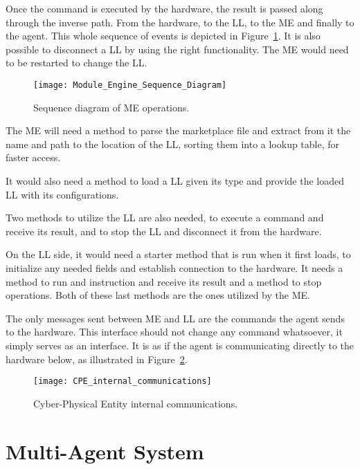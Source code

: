 Once the command is executed by the hardware, the result is passed along through the inverse path. From the hardware, to the \acrlong{LL}, to the \acrlong{ME} and finally to the agent. This whole sequence of events is depicted in Figure~\ref{fig:module_engine_sequence_diagram}. It is also possible to disconnect a \acrshort{LL} by using the right functionality. The \acrshort{ME} would need to be restarted to change the \acrshort{LL}.

\begin{figure}[h!]
	\centering
	\texttt{[image: Module\_Engine\_Sequence\_Diagram]}
	\caption{Sequence diagram of \acrlong{ME} operations.}
	\label{fig:module_engine_sequence_diagram}
\end{figure}

The \acrshort{ME} will need a method to parse the marketplace file and extract from it the name and path to the location of the \acrshort{LL}, sorting them into a lookup table, for faster access.

It would also need a method to load a \acrlong{LL} given its type and provide the loaded \acrshort{LL} with its configurations.

Two methods to utilize the \acrshort{LL} are also needed, to execute a command and receive its result, and to stop the \acrshort{LL} and disconnect it from the hardware.

On the \acrlong{LL} side, it would need a starter method that is run when it first loads, to initialize any needed fields and establish connection to the hardware. It needs a method to run and instruction and receive its result and a method to stop operations. Both of these last methods are the ones utilized by the \acrshort{ME}.

The only messages sent between \acrshort{ME} and \acrshort{LL} are the commands the agent sends to the hardware. This interface should not change any command whatsoever, it simply serves as an interface. It is as if the agent is communicating directly to the hardware below, as illustrated in Figure~\ref{fig:cpe_internal_communications}. 

\begin{figure}[h!]
	\centering
	\texttt{[image: CPE\_internal\_communications]}
	\caption{Cyber-Physical Entity internal communications.}
	\label{fig:cpe_internal_communications}
\end{figure}

\section{Multi-Agent System}
\label{sec:multi-agent_system}

